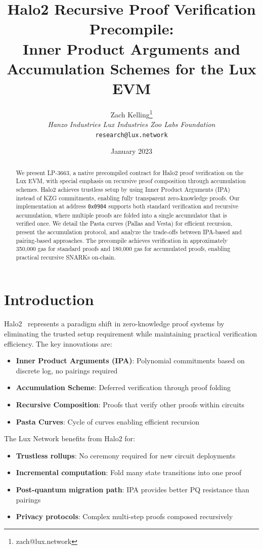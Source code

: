 \documentclass[11pt,a4paper]{article}
\title{Halo2 Recursive Proof Verification Precompile:\\Inner Product Arguments and Accumulation Schemes for the Lux EVM}
\author{Zach Kelling\thanks{zach@lux.network} \\ \textit{Hanzo Industries \quad Lux Industries \quad Zoo Labs Foundation} \\ \texttt{research@lux.network}}
\date{January 2023}
\theoremstyle{definition}
\begin{document}
\maketitle

\begin{abstract}
We present LP-3663, a native precompiled contract for Halo2 proof verification on the Lux EVM, with special emphasis on recursive proof composition through accumulation schemes. Halo2 achieves trustless setup by using Inner Product Arguments (IPA) instead of KZG commitments, enabling fully transparent zero-knowledge proofs. Our implementation at address \texttt{0x0904} supports both standard verification and recursive accumulation, where multiple proofs are folded into a single accumulator that is verified once. We detail the Pasta curves (Pallas and Vesta) for efficient recursion, present the accumulation protocol, and analyze the trade-offs between IPA-based and pairing-based approaches. The precompile achieves verification in approximately 350,000 gas for standard proofs and 180,000 gas for accumulated proofs, enabling practical recursive SNARKs on-chain.
\end{abstract}

\section{Introduction}

Halo2~\cite{halo2} represents a paradigm shift in zero-knowledge proof systems by eliminating the trusted setup requirement while maintaining practical verification efficiency. The key innovations are:

\begin{itemize}
    \item \textbf{Inner Product Arguments (IPA)}: Polynomial commitments based on discrete log, no pairings required
    \item \textbf{Accumulation Scheme}: Deferred verification through proof folding
    \item \textbf{Recursive Composition}: Proofs that verify other proofs within circuits
    \item \textbf{Pasta Curves}: Cycle of curves enabling efficient recursion
\end{itemize}

The Lux Network benefits from Halo2 for:
\begin{itemize}
    \item \textbf{Trustless rollups}: No ceremony required for new circuit deployments
    \item \textbf{Incremental computation}: Fold many state transitions into one proof
    \item \textbf{Post-quantum migration path}: IPA provides better PQ resistance than pairings
    \item \textbf{Privacy protocols}: Complex multi-step proofs composed recursively
\end{itemize}
\end{document}
